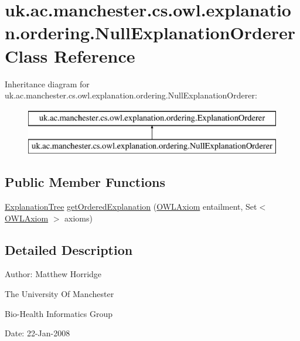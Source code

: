 \hypertarget{classuk_1_1ac_1_1manchester_1_1cs_1_1owl_1_1explanation_1_1ordering_1_1_null_explanation_orderer}{\section{uk.\-ac.\-manchester.\-cs.\-owl.\-explanation.\-ordering.\-Null\-Explanation\-Orderer Class Reference}
\label{classuk_1_1ac_1_1manchester_1_1cs_1_1owl_1_1explanation_1_1ordering_1_1_null_explanation_orderer}
}
Inheritance diagram for uk.\-ac.\-manchester.\-cs.\-owl.\-explanation.\-ordering.\-Null\-Explanation\-Orderer\-:\begin{figure}[H]
\begin{center}
\leavevmode
\includegraphics[height=2.000000cm]{classuk_1_1ac_1_1manchester_1_1cs_1_1owl_1_1explanation_1_1ordering_1_1_null_explanation_orderer}
\end{center}
\end{figure}
\subsection*{Public Member Functions}
\begin{DoxyCompactItemize}
\item 
\hyperlink{classuk_1_1ac_1_1manchester_1_1cs_1_1owl_1_1explanation_1_1ordering_1_1_explanation_tree}{Explanation\-Tree} \hyperlink{classuk_1_1ac_1_1manchester_1_1cs_1_1owl_1_1explanation_1_1ordering_1_1_null_explanation_orderer_af193cd8fc05bd5247456b15ac1b92459}{get\-Ordered\-Explanation} (\hyperlink{interfaceorg_1_1semanticweb_1_1owlapi_1_1model_1_1_o_w_l_axiom}{O\-W\-L\-Axiom} entailment, Set$<$ \hyperlink{interfaceorg_1_1semanticweb_1_1owlapi_1_1model_1_1_o_w_l_axiom}{O\-W\-L\-Axiom} $>$ axioms)
\end{DoxyCompactItemize}


\subsection{Detailed Description}
Author\-: Matthew Horridge\par
 The University Of Manchester\par
 Bio-\/\-Health Informatics Group\par
 Date\-: 22-\/\-Jan-\/2008\par
\par


